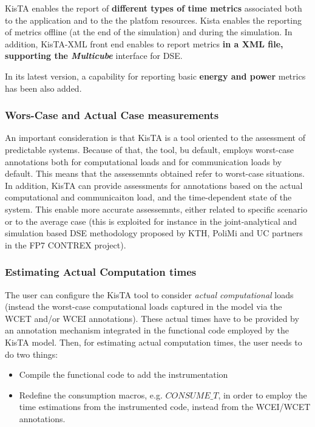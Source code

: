 KisTA enables the report of \textbf{different types of time metrics} associated both to the application and to the 
the platfom resources.
Kista enables the reporting of metrics offline (at the end of the simulation) and 
during the simulation.
In addition, KisTA-XML front end enables to report metrics \textbf{in a XML file, supporting
the \emph{Multicube}} interface for DSE.

In its latest version, a capability for reporting basic \textbf{energy and power} metrics has been also added.

\subsubsection{Wors-Case and Actual Case measurements}
An important consideration is that KisTA is a tool oriented to the assessment of predictable systems.
Because of that, the tool, bu default, employs worst-case annotations both for computational loads
and for communication loads by default.
%
This means that the assessemnts obtained refer to worst-case situations.
%
In addition, KisTA can provide assessments for annotations based on the actual computational and communicaiton
load, and the time-dependent state of the system.
This enable more accurate assessemnts, either related to specific scenario or to the average case
(this is exploited for instance in the joint-analytical and simulation based DSE methodology proposed
by KTH, PoliMi and UC partners in the FP7 CONTREX project).

\subsubsection{Estimating Actual Computation times}
The user can configure the KisTA tool to consider \emph{actual computational} loads
(instead the worst-case computational loads captured in the model via the WCET and/or WCEI annotations).
%
These actual times have to be provided by an annotation mechanism integrated in the functional code
employed by the KisTA model.
%
Then, for estimating actual computation times, the user needs to do two things:

\begin{itemize}
\item Compile the functional code to add the instrumentation
\item Redefine the consumption macros, e.g. $CONSUME\_T$, in order to employ
the time estimations from the instrumented code, instead from the WCEI/WCET annotations.
\end{itemize}

